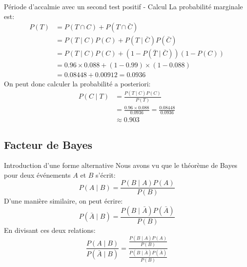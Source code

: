 \documentclass[10pt]{beamer}  %
\begin{document}
\begin{frame}{Période d'accalmie avec un second test positif - Calcul}
	La probabilité marginale est:
	\begin{equation}
		\begin{aligned}
			P(T) &= P(T \cap C) + P(T \cap \bar{C}) \\
			&= P(T \mid C) P(C) + P(T \mid \bar{C}) P(\bar{C}) \\
			&= P(T \mid C) P(C) + (1 - P(\bar{T} \mid \bar{C})) (1 - P(C)) \\
			&= 0.96 \times 0.088 + (1 - 0.99) \times (1 - 0.088) \\
			&= 0.08448 + 0.00912 = 0.0936
		\end{aligned}
		\nonumber
	\end{equation}
	\pause
	On peut donc calculer la probabilité a posteriori:
	\begin{equation}
		\begin{aligned}
			P(C \mid T) &= \frac{P(T \mid C) P(C)}{P(T)} \\
			&= \frac{0.96 \times 0.088}{0.0936} 
			= \frac{0.08448}{0.0936} \\
			&\approx 0.903
		\end{aligned}
		\nonumber
	\end{equation}
\end{frame}

\subsection{Facteur de Bayes}

\begin{frame}{Introduction d'une forme alternative}
	Nous avons vu que le théorème de Bayes pour deux événements $A$ et $B$ s'écrit:
	\begin{equation}
		P(A \mid B) = \frac{P(B \mid A) P(A)}{P(B)}
		\nonumber
	\end{equation}
	\pause
	D'une manière similaire, on peut écrire:
	\begin{equation}
		P(\bar{A} \mid B) = \frac{P(B \mid \bar{A}) P(\bar{A})}{P(B)}
		\nonumber
	\end{equation}
	\pause
	En divisant ces deux relations:
	\begin{equation}
		\frac{P(A \mid B)}{P(\bar{A} \mid B)} = \frac{\frac{P(B \mid A) P(A)}{P(B)}}{\frac{P(B \mid \bar{A}) P(\bar{A})}{P(B)}}
		\nonumber
	\end{equation}	
\end{frame}
\end{document}
